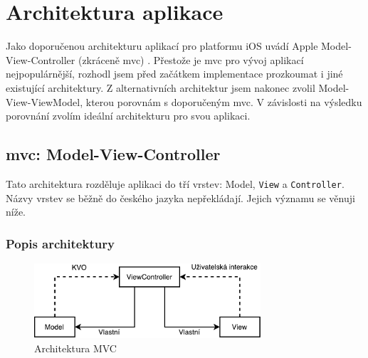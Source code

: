 \section{Architektura aplikace}\label{analyza-architektura}

Jako doporučenou architekturu aplikací pro platformu iOS uvádí Apple Model-View-Controller (zkráceně \acrshort{mvc}) \cite{gc-apple-recommends}.
Přestože je \acrshort{mvc} pro vývoj aplikací nejpopulárnější, rozhodl jsem před začátkem implementace prozkoumat i jiné existující architektury.
Z alternativních architektur jsem nakonec zvolil Model-View-ViewModel, kterou porovnám s doporučeným \acrshort{mvc}.
V závislosti na výsledku porovnání zvolím ideální architekturu pro svou aplikaci.

\subsection{\acrshort{mvc}: Model-View-Controller}\label{analyza-mvc}
Tato architektura rozděluje aplikaci do tří vrstev: Model, \texttt{View} a \texttt{Controller}.
Názvy vrstev se běžně do českého jazyka nepřekládají.
Jejich významu se věnuji níže.

\subsubsection*{Popis architektury}

\begin{figure}\centering
	\includegraphics[width=0.75\textwidth]{assets/analysis-mvc-architecture.pdf}
	\caption{Architektura MVC}\label{fig:architektura-mvc}
\end{figure}

